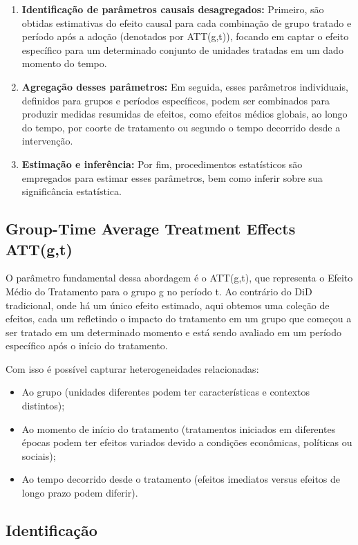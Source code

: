 \documentclass[
	12pt,				%
	oneside,			%
	a4paper,			%
	english,			%
	french,				%
	spanish,			%
	brazil				%
	]{abntex2}
\begin{document}
\begin{enumerate}
\item \textbf{Identificação de parâmetros causais desagregados:} Primeiro, são obtidas estimativas do efeito causal para cada combinação de grupo tratado e período após a adoção (denotados por ATT(g,t)), focando em captar o efeito específico para um determinado conjunto de unidades tratadas em um dado momento do tempo.

\item \textbf{Agregação desses parâmetros:} Em seguida, esses parâmetros individuais, definidos para grupos e períodos específicos, podem ser combinados para produzir medidas resumidas de efeitos, como efeitos médios globais, ao longo do tempo, por coorte de tratamento ou segundo o tempo decorrido desde a intervenção.

\item \textbf{Estimação e inferência:} Por fim, procedimentos estatísticos são empregados para estimar esses parâmetros, bem como inferir sobre sua significância estatística.
\end{enumerate}

\subsection{Group-Time Average Treatment Effects ATT(g,t)}

O parâmetro fundamental dessa abordagem é o ATT(g,t), que representa o Efeito Médio do Tratamento para o grupo g no período t. Ao contrário do DiD tradicional, onde há um único efeito estimado, aqui obtemos uma coleção de efeitos, cada um refletindo o impacto do tratamento em um grupo que começou a ser tratado em um determinado momento e está sendo avaliado em um período específico após o início do tratamento.

Com isso é possível capturar heterogeneidades relacionadas:
\begin{itemize}
\item Ao grupo (unidades diferentes podem ter características e contextos distintos);
\item Ao momento de início do tratamento (tratamentos iniciados em diferentes épocas podem ter efeitos variados devido a condições econômicas, políticas ou sociais);
\item Ao tempo decorrido desde o tratamento (efeitos imediatos versus efeitos de longo prazo podem diferir).
\end{itemize}

\subsection{Identificação}
\end{document}

